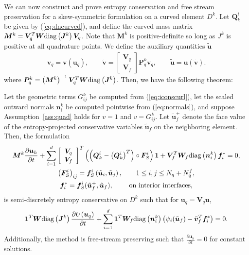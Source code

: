 \documentclass[review]{siamart0216}
\theoremstyle{assumption}
\newcommand{\pd}[2]{\frac{\partial#1}{\partial#2}}
\newcommand{\LRp}[1]{\left( #1 \right)}
\newcommand{\LRs}[1]{\left[ #1 \right]}
\newcommand{\diag}[1]{{\rm diag}\LRp{#1}}
\begin{document}
We can now construct and prove entropy conservation and free stream preservation for a skew-symmetric formulation on a curved element $D^k$.  Let $\bm{Q}^i_k$ be given by (\ref{eq:dncurved}), and define the curved mass matrix $\bm{M}^k = \bm{V}_q^T\bm{W}\diag{\bm{J}^k}\bm{V}_q$.  Note that $\bm{M}^k$ is positive-definite so long as $J^k$ is positive at all quadrature points.  We define the auxiliary quantities $\tilde{\bm{u}}$ 
\begin{gather*}
\bm{v}_q = \bm{v}\LRp{\bm{u}_q}, \qquad \tilde{\bm{v}} = \begin{bmatrix}
\bm{V}_q\\
\bm{V}_f
\end{bmatrix}\bm{P}^k_q\bm{v}_q, \qquad \tilde{\bm{u}} = \bm{u}\LRp{\tilde{\bm{v}}}.
\end{gather*}
where $\bm{P}^k_q = \LRp{\bm{M}^k}^{-1}\bm{V}_q^T\bm{W}\diag{\bm{J}^k}$.  Then, we have the following theorem:
\begin{theorem}
\label{thm:skewformcurved}
Let the geometric terms $G^k_{ij}$ be computed from (\ref{eq:iconscurl}), let the scaled outward normals $\bm{n}^k_i$ be computed pointwise from (\ref{eq:normals}), and suppose Assumption~\ref{ass:quad} holds for $v = 1$ and $v= G^k_{ij}$.  Let $\tilde{\bm{u}}_f^+$ denote the face value of the entropy-projected conservative variables $\tilde{\bm{u}}_f$ on the neighboring element.  Then, the formulation
\begin{gather}
\bm{M}^k\pd{\bm{u}_h}{t} + 
\sum_{i=1}^d \LRs{\begin{array}{cc}
\bm{V}_q \\
\bm{V}_f\end{array}}^T \LRp{\LRp{\bm{Q}^i_k - \LRp{\bm{Q}^i_k}^T} \circ \bm{F}^i_S}\bm{1} + \bm{V}_f^T \bm{W}_f \diag{{\bm{n}^k_i}}\bm{f}_i^* = 0, \label{eq:skewformcurved}\\
\LRp{\bm{F}^i_S}_{ij} = \bm{f}^i_S\LRp{\tilde{\bm{u}}_i,\tilde{\bm{u}}_j}, \qquad 1\leq i,j\leq N_q + N^f_q, \nonumber\\
\bm{f}_i^* = \bm{f}^i_S(\tilde{\bm{u}}_f^+,\tilde{\bm{u}}_f), \qquad \text{ on interior interfaces,} \nonumber
\end{gather}
is semi-discretely entropy conservative on $D^k$ such that for $\bm{u}_q = \bm{V}_q\bm{u}$,
\begin{gather*}
\bm{1}^T\bm{W}\diag{\bm{J}^k}\pd{U(\bm{u}_q)}{t} + \sum_{i=1}^d\bm{1}^T\bm{W}_f \diag{\bm{n}^k_i} \LRp{\psi_i(\tilde{\bm{u}}_f) - \tilde{\bm{v}}_f^T\bm{f}_i^*} = 0.
\end{gather*}
Additionally, the method is free-stream preserving such that $\pd{\bm{u}_h}{t} = 0$ for constant solutions.
\end{theorem}
\end{document}
